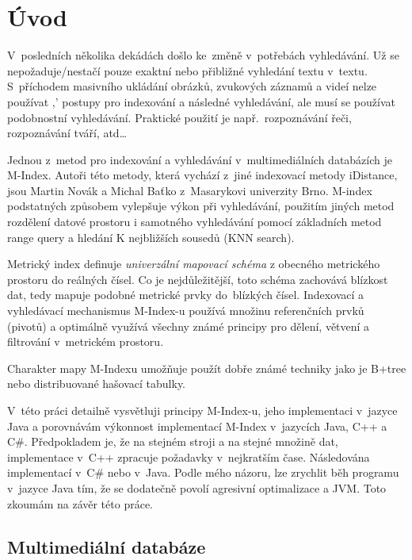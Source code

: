 \chapter{Úvod}

V~posledních několika dekádách došlo ke~změně v~potřebách vyhledávání.
Už se nepožaduje/nestačí pouze exaktní nebo přibližné vyhledání textu
v~textu. S~příchodem masivního ukládání obrázků, zvukových záznamů
a videí nelze používat ,' postupy pro indexování a následné
vyhledávání, ale musí se používat podobnostní vyhledávání. Praktické
použití je např.~rozpoznávání řeči, rozpoznávání tváří, atd\ldots{}

Jednou z~metod pro indexování a vyhledávání v~multimediálních databázích
je M-Index\cite{Novak:2009:MIE:1637863.1638184}\@. Autoři této
metody, která vychází z~jiné indexovací metody iDistance\cite{Jagadish:2005:IAB:1071610.1071612},
jsou Martin Novák a Michal Baťko z~Masarykovi univerzity Brno\@.
M-index podstatných způsobem vylepšuje výkon při vyhledávání, použitím
jiných metod rozdělení datové prostoru i samotného vyhledávání pomocí
základních metod range query a hledání K nejbližších sousedů (KNN
search)\@.

Metrický index definuje \emph{univerzální mapovací schéma} z obecného
metrického prostoru do reálných čísel\@. Co je nejdůležitější, toto
schéma zachovává blízkost dat, tedy mapuje podobné metrické prvky
do~blízkých čísel\@. Indexovací a vyhledávací mechanismus M-Index-u
používá množinu referenčních prvků (pivotů) a optimálně využívá všechny
známé principy pro dělení, větvení a filtrování v~metrickém prostoru\@.

Charakter mapy M-Indexu umožňuje použít dobře známé techniky jako
je B+tree\cite{Cormen:2001:IA:580470} nebo distribuované
hašovací tabulky\@.

V~této práci detailně vysvětluji principy M-Index-u, jeho implementaci
v~jazyce Java a porovnávám výkonnost implementací M-Index v~jazycích
Java, C++ a C\#. Předpokladem je, že na stejném stroji a na stejné
množině dat, implementace v~C++ zpracuje požadavky v~nejkratším
čase. Následována implementací v~C\# nebo v~Java. Podle mého názoru,
lze zrychlit běh programu v~jazyce Java tím, že se dodatečně povolí
agresivní optimalizace a  JVM. Toto zkoumám na závěr této práce.

\section{Multimediální databáze}

